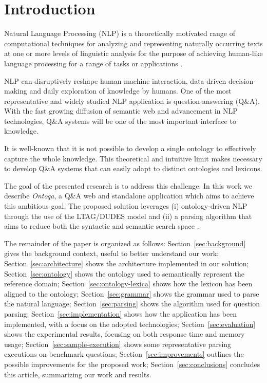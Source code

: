 \section{Introduction}
\label{sec:introduction}

Natural Language Processing (NLP) is a theoretically motivated range of
computational techniques for analyzing and representing naturally occurring texts
at one or more levels of linguistic analysis for the purpose of achieving human-like
language processing for a range of tasks or applications \cite{liddy2001natural}.

NLP can disruptively reshape human-machine interaction, data-driven decision-making and daily exploration of knowledge by humans.
%
One of the most representative and widely studied NLP application is question-answering (Q\&A).
%
With the fast growing diffusion of semantic web and advancement in NLP technologies, Q\&A systems will be one of the most important interface to knowledge.

It is well-known that it is not possible to develop a single ontology to effectively capture the whole knowledge.
%
This theoretical and intuitive limit makes necessary to develop Q\&A systems that can easily adapt to distinct ontologies and lexicons.

The goal of the presented research is to address this  challenge.
%
In this work we describe \textit{Ontoqa}, a Q\&A web and standalone application which aims to achieve this ambitious goal.
%
The proposed solution leverages (i) ontology-driven NLP through the use of the LTAG/DUDES model and (ii) a parsing algorithm that aims to reduce both the syntactic and  semantic search space \cite{cimiano2014ontology}.


The remainder of the paper is organized as follows:
Section~\ref{sec:background} gives the background context, useful to better understand our work;
Section~\ref{sec:architecture} shows the architecture implemented in our solution;
Section~\ref{sec:ontology} shows the ontology used to semantically represent the reference domain;
Section~\ref{sec:ontology-lexica} shows how the lexicon has been aligned to the ontology;
Section~\ref{sec:grammar} shows the grammar used to parse the natural language;
Section~\ref{sec:parsing} shows the algorithm used for question parsing;
Section~\ref{sec:implementation} shows how the application has been implemented, with a focus on the adopted technologies;
Section~\ref{sec:evaluation} shows the experimental results, focusing on both response time and memory usage;
Section~\ref{sec:sample-execution} shows some representative parsing executions on benchmark questions;
Section~\ref{sec:improvements} outlines the possible improvements for the proposed work;
Section~\ref{sec:conclusions} concludes this article, summarizing our work and results.